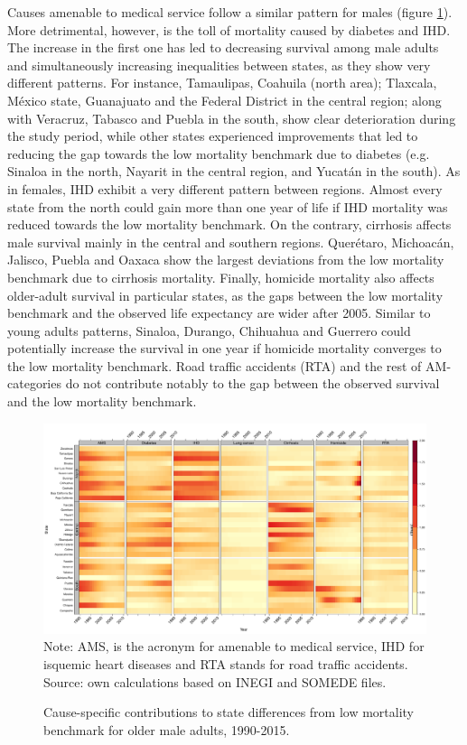 \documentclass[11.5pt]{article}
\begin{document}
\begin{spacing}{1.5}
Causes amenable to medical service follow a similar pattern for males (figure  \ref{fig:e40_74_males}). More detrimental, however, is the toll of mortality caused by diabetes and IHD. The increase in the first one has led to decreasing survival among male adults and simultaneously increasing inequalities between states, as they show very different patterns. For instance,  Tamaulipas, Coahuila (north area); Tlaxcala, M\'exico state, Guanajuato and the Federal District in the central region; along with Veracruz, Tabasco and Puebla in the south, show clear deterioration during the study period, while other states experienced improvements that led to reducing the gap towards the low mortality benchmark due to diabetes (e.g. Sinaloa in the north, Nayarit in the central region, and Yucat\'an in the south). As in females, IHD exhibit a very different pattern between regions. Almost every state from the north could gain more than one year of life if IHD mortality was reduced towards the low mortality benchmark. On the contrary, cirrhosis affects male survival mainly in the central and southern regions. Quer\'etaro, Michoac\'an, Jalisco, Puebla and Oaxaca show the largest deviations from the low mortality benchmark due to cirrhosis mortality. Finally, homicide mortality also affects older-adult survival in particular states, as the gaps between the low mortality benchmark and the observed life expectancy are wider after 2005. Similar to young adults patterns, Sinaloa, Durango, Chihuahua and Guerrero could potentially increase the survival in one year if homicide mortality converges to the low mortality benchmark. Road traffic accidents (RTA) and the rest of AM-categories do not contribute notably to the gap between the observed survival and the low mortality benchmark. 




\begin{figure}[h]
\centering
\caption{Cause-specific contributions to state differences from low mortality benchmark for older male adults, 1990-2015.}
\label{fig:e40_74_males}
\includegraphics[scale=.33]{Figures/Adult_Male_heatmap.pdf}
Note: AMS, is the acronym for amenable to medical service, IHD for isquemic heart diseases and RTA stands for road traffic accidents. Source: own calculations based on INEGI and SOMEDE files. 
\end{figure}



\end{spacing}
\end{document}
